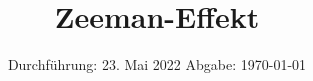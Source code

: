 

\subject{V27}
\title{Zeeman-Effekt}
\date{%
  Durchführung: 23. Mai 2022
  \hspace{3em}
  Abgabe: \today
}



\maketitle
\thispagestyle{empty}
\tableofcontents
\newpage

%






\printbibliography{}
%


